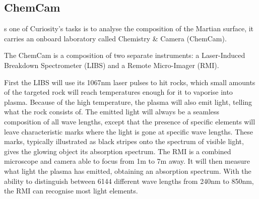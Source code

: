 \subsection{ChemCam}
s one of Curiosity's tasks is to analyse the composition of the Martian surface, it carries an onboard laboratory called Chemistry \& Camera (ChemCam).

The ChemCam is a composition of two separate instruments: a Laser-Induced Breakdown Spectrometer (LIBS) and a Remote Micro-Imager (RMI).

First the LIBS will use its 1067nm laser pulses to hit rocks, which small amounts of the targeted rock will reach temperatures enough for it to vaporise into plasma.
Because of the high temperature, the plasma will also emit light, telling what the rock consists of.
The emitted light will always be a seamless composition of all wave lengths, except that the presence of specific elements will leave characteristic marks where the light is gone at specific wave lengths.
These marks, typically illustrated as black stripes onto the spectrum of visible light, gives the glowing object its absorption spectrum.
The RMI is a combined microscope and camera able to focus from 1m to 7m away.
It will then measure what light the plasma has emitted, obtaining an absorption spectrum.
With the ability to distinguish between 6144 different wave lengths from 240nm to 850nm, the RMI can recognise most light elements. \cite{ChemCam}